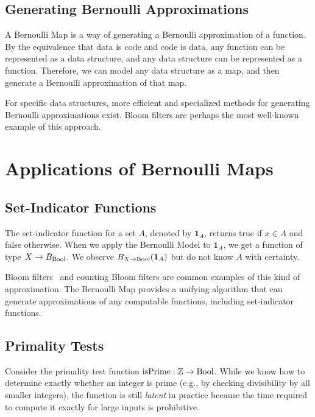 \documentclass[../main.tex]{subfiles}
\begin{document}
\subsection{Generating Bernoulli Approximations}

A Bernoulli Map is a way of generating a Bernoulli approximation of a function. By the equivalence that data is code and code is data, any function can be represented as a data structure, and any data structure can be represented as a function. Therefore, we can model any data structure as a map, and then generate a Bernoulli approximation of that map.

For specific data structures, more efficient and specialized methods for generating Bernoulli approximations exist. Bloom filters are perhaps the most well-known example of this approach.

\section{Applications of Bernoulli Maps}
\label{sec:bernoulli_maps_applications}

\subsection{Set-Indicator Functions}

The set-indicator function for a set $A$, denoted by $\mathbf{1}_A$, returns true if $x \in A$ and false otherwise. When we apply the Bernoulli Model to $\mathbf{1}_A$, we get a function of type $X \to B_{\mathrm{Bool}}$. We observe $B_{X \to \mathrm{Bool}}(\mathbf{1}_A)$ but do not know $A$ with certainty.

Bloom filters~\cite{bloom1970} and counting Bloom filters are common examples of this kind of approximation. The Bernoulli Map provides a unifying algorithm that can generate approximations of any computable functions, including set-indicator functions.

\subsection{Primality Tests}

Consider the primality test function $\mathrm{isPrime} : \mathbb{Z} \to \mathrm{Bool}$. While we know how to determine exactly whether an integer is prime (e.g., by checking divisibility by all smaller integers), the function is still \emph{latent} in practice because the time required to compute it exactly for large inputs is prohibitive.
\end{document}
